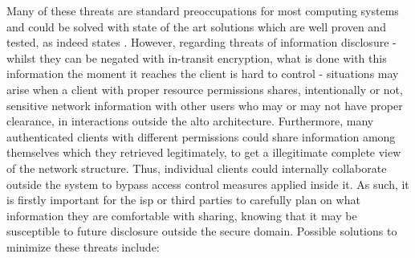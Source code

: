     Many of these threats are standard preoccupations for most computing systems and could be solved with state of the art solutions which are well proven and tested, as indeed states \cite{alto-protocol}.
    However, regarding threats of information disclosure - whilst they can be negated with in-transit encryption, what is done with this information the moment it reaches the client is hard to control - situations may arise when a client with proper resource permissions shares, intentionally or not, sensitive network information with other users who may or may not have proper clearance, in interactions outside the \gls{alto} architecture.
    Furthermore, many authenticated clients with different permissions could share information among themselves which they retrieved legitimately, to get a illegitimate complete view of the network structure.
    Thus, individual clients could internally collaborate outside the system to bypass access control measures applied inside it.
    As such, it is firstly important for the \gls{isp} or third parties to carefully plan on what information they are comfortable with sharing, knowing that it may be susceptible to future disclosure outside the secure domain.
    Possible solutions to minimize these threats include:

